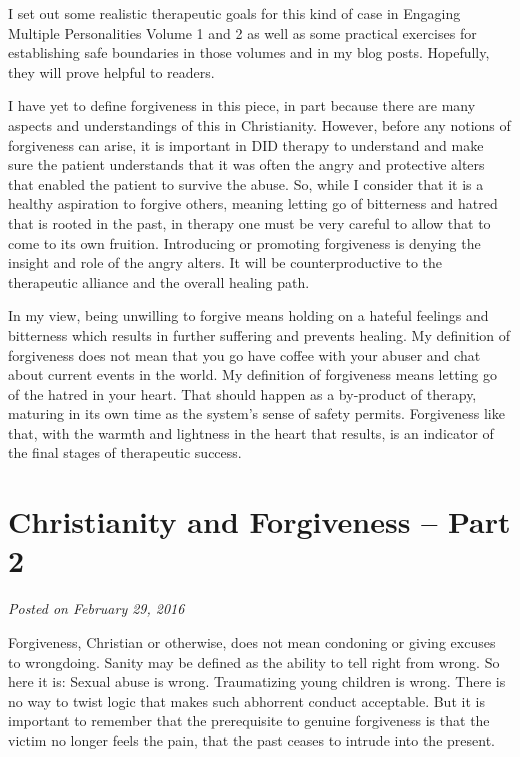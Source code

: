 \documentclass[]{book}
\begin{document}
I set out some realistic therapeutic goals for this kind of case in Engaging Multiple Personalities Volume 1 and 2 as well as some practical exercises for establishing safe boundaries in those volumes and in my blog posts. Hopefully, they will prove helpful to readers.

I have yet to define forgiveness in this piece, in part because there are many aspects and understandings of this in Christianity. However, before any notions of forgiveness can arise, it is important in DID therapy to understand and make sure the patient understands that it was often the angry and protective alters that enabled the patient to survive the abuse. So, while I consider that it is a healthy aspiration to forgive others, meaning letting go of bitterness and hatred that is rooted in the past, in therapy one must be very careful to allow that to come to its own fruition. Introducing or promoting forgiveness is denying the insight and role of the angry alters. It will be counterproductive to the therapeutic alliance and the overall healing path.

In my view, being unwilling to forgive means holding on a hateful feelings and bitterness which results in further suffering and prevents healing. My definition of forgiveness does not mean that you go have coffee with your abuser and chat about current events in the world. My definition of forgiveness means letting go of the hatred in your heart. That should happen as a by-product of therapy, maturing in its own time as the system's sense of safety permits. Forgiveness like that, with the warmth and lightness in the heart that results, is an indicator of the final stages of therapeutic success.

\hypertarget{christianity-and-forgiveness-part-2}{%
\section{Christianity and Forgiveness -- Part 2}\label{christianity-and-forgiveness-part-2}}

\emph{Posted on February 29, 2016}

Forgiveness, Christian or otherwise, does not mean condoning or giving excuses to wrongdoing. Sanity may be defined as the ability to tell right from wrong. So here it is: Sexual abuse is wrong. Traumatizing young children is wrong. There is no way to twist logic that makes such abhorrent conduct acceptable. But it is important to remember that the prerequisite to genuine forgiveness is that the victim no longer feels the pain, that the past ceases to intrude into the present.
\end{document}

